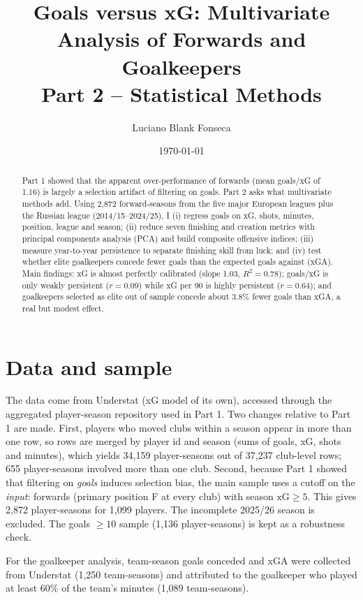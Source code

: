 \documentclass[11pt,a4paper]{article}
\title{Goals versus xG: Multivariate Analysis of Forwards and Goalkeepers\\
\large Part 2 -- Statistical Methods}
\author{Luciano Blank Fonseca}
\date{\today}
\begin{document}
\maketitle

\begin{abstract}
Part 1 showed that the apparent over-performance of forwards (mean goals/xG of 1.16) is largely a selection artifact of filtering on goals. Part 2 asks what multivariate methods add. Using 2{,}872 forward-seasons from the five major European leagues plus the Russian league (2014/15--2024/25), I (i) regress goals on xG, shots, minutes, position, league and season; (ii) reduce seven finishing and creation metrics with principal components analysis (PCA) and build composite offensive indices; (iii) measure year-to-year persistence to separate finishing skill from luck; and (iv) test whether elite goalkeepers concede fewer goals than the expected goals against (xGA). Main findings: xG is almost perfectly calibrated (slope 1.03, $R^2=0.78$); goals/xG is only weakly persistent ($r=0.09$) while xG per 90 is highly persistent ($r=0.64$); and goalkeepers selected as elite out of sample concede about 3.8\% fewer goals than xGA, a real but modest effect.
\end{abstract}

\section{Data and sample}

The data come from Understat (xG model of its own), accessed through the aggregated player-season repository used in Part 1. Two changes relative to Part 1 are made. First, players who moved clubs within a season appear in more than one row, so rows are merged by player id and season (sums of goals, xG, shots and minutes), which yields 34{,}159 player-seasons out of 37{,}237 club-level rows; 655 player-seasons involved more than one club. Second, because Part 1 showed that filtering on \emph{goals} induces selection bias, the main sample uses a cutoff on the \emph{input}: forwards (primary position F at every club) with season $\text{xG}\geq 5$. This gives 2{,}872 player-seasons for 1{,}099 players. The incomplete 2025/26 season is excluded. The goals $\geq 10$ sample (1{,}136 player-seasons) is kept as a robustness check.




For the goalkeeper analysis, team-season goals conceded and xGA were collected from Understat (1{,}250 team-seasons) and attributed to the goalkeeper who played at least 60\% of the team's minutes (1{,}089 team-seasons).
\end{document}
